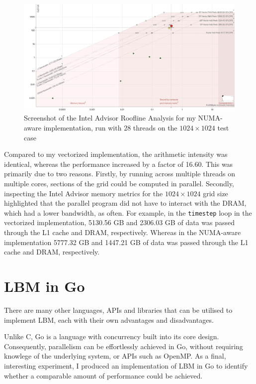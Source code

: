 \documentclass[twocolumn, a4paper]{article}
\begin{document}
\begin{figure}[htbp]
  \includegraphics[width=\linewidth]{roofline_numa.png}
  \caption{Screenshot of the Intel Advisor Roofline Analysis for my NUMA-aware implementation, run with 28 threads on the $1024\times1024$ test case}\label{fig:roofline_numa}
\end{figure}

Compared to my vectorized implementation, the arithmetic intensity was identical, whereas the performance increased by a factor of 16.60.
This was primarily due to two reasons.
Firstly, by running across multiple threads on multiple cores, sections of the grid could be computed in parallel.
Secondly, inspecting the Intel Advisor memory metrics for the $1024\times1024$ grid size highlighted that the parallel program did not have to interact with the DRAM, which had a lower bandwidth, as often.
For example, in the \texttt{timestep} loop in the vectorized implementation, 5130.56 GB and 2306.03 GB of data was passed through the L1 cache and DRAM, respectively.
Whereas in the NUMA-aware implementation 5777.32 GB and 1447.21 GB of data was passed through the L1 cache and DRAM, respectively. 

\section{LBM in Go}

There are many other languages, APIs and libraries that can be utilised to implement LBM, each with their own advantages and disadvantages.

Unlike C, Go is a language with concurrency built into its core design.
Consequently, parallelism can be effortlessly achieved in Go, without requiring knowlege of the underlying system, or APIs such as OpenMP.
As a final, interesting experiment, I produced an implementation of LBM in Go to identify whether a comparable amount of performance could be achieved.
\end{document}
